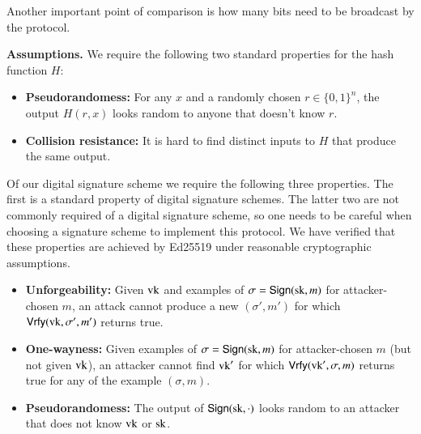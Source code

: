 \documentclass{article}
\begin{document}
Another important point of comparison is how many bits need to be broadcast by the protocol.

{\bf Assumptions.} We require the following two standard properties for the hash function $H$:
\begin{itemize}
	\item \textbf{Pseudorandomess:} For any $x$ and a randomly chosen $r\in\{0,1\}^n$, the output $H(r,x)$ looks random to anyone that doesn't know $r$.
	\item \textbf{Collision resistance:} It is hard to find distinct inputs to $H$ that produce the same output.
\end{itemize}
Of our digital signature scheme we require the following three properties. The first is a standard property of digital signature schemes. The latter two are not commonly required of a digital signature scheme, so one needs to be careful when choosing a signature scheme to implement this protocol. We have verified that these properties are achieved by Ed25519 under reasonable cryptographic assumptions. 
\begin{itemize}
	\item \textbf{Unforgeability:} Given $\mathrm{vk}$ and examples of $\sigma=\mathsf{Sign}(\mathrm{sk},m)$ for attacker-chosen $m$, an attack cannot produce a new $(\sigma',m')$ for which $\mathsf{Vrfy}(\mathrm{vk}, \sigma', m')$ returns true.
	\item \textbf{One-wayness:}	Given examples of $\sigma=\mathsf{Sign}(\mathrm{sk},m)$ for attacker-chosen $m$ (but not given $\mathrm{vk}$), an attacker cannot find $\mathrm{vk}'$ for which $\mathsf{Vrfy}(\mathrm{vk}', \sigma, m )$ returns true for any of the example $(\sigma,m)$.
	\item \textbf{Pseudorandomess:} The output of $\mathsf{Sign}(\mathrm{sk},\cdot)$ looks random to an attacker that does not know $\mathrm{vk}$ or $\mathrm{sk}$.
\end{itemize}
\end{document}
